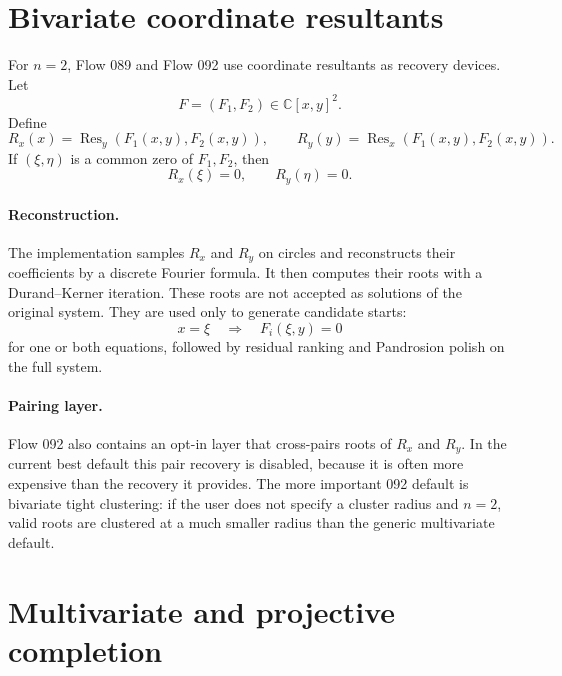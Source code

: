 \documentclass[11pt,a4paper]{article}
\theoremstyle{definition}
\theoremstyle{plain}
\theoremstyle{remark}
\newcommand{\C}{\mathbb C}
\newcommand{\Res}{\operatorname{Res}}
\begin{document}
\section{Bivariate coordinate resultants}

For \(n=2\), Flow 089 and Flow 092 use coordinate resultants as recovery
devices.  Let
\[
  F=(F_1,F_2)\in\C[x,y]^2.
\]
Define
\begin{equation}
  \label{eq:coord-res}
  R_x(x)=\Res_y(F_1(x,y),F_2(x,y)),
  \qquad
  R_y(y)=\Res_x(F_1(x,y),F_2(x,y)).
\end{equation}
If \((\xi,\eta)\) is a common zero of \(F_1,F_2\), then
\[
  R_x(\xi)=0,\qquad R_y(\eta)=0.
\]

\paragraph{Reconstruction.}
The implementation samples \(R_x\) and \(R_y\) on circles and reconstructs
their coefficients by a discrete Fourier formula.  It then computes their roots
with a Durand--Kerner iteration.  These roots are not accepted as solutions of
the original system.  They are used only to generate candidate starts:
\[
  x=\xi\quad\Rightarrow\quad
  F_i(\xi,y)=0
\]
for one or both equations, followed by residual ranking and Pandrosion polish
on the full system.

\paragraph{Pairing layer.}
Flow 092 also contains an opt-in layer that cross-pairs roots of \(R_x\) and
\(R_y\).  In the current best default this pair recovery is disabled, because
it is often more expensive than the recovery it provides.  The more important
092 default is bivariate tight clustering: if the user does not specify a
cluster radius and \(n=2\), valid roots are clustered at a much smaller radius
than the generic multivariate default.

\section{Multivariate and projective completion}
\end{document}
